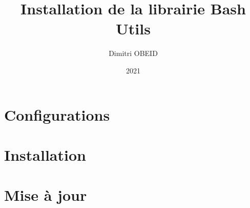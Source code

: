 \documentclass[a4paper,10pt]{article}
\title{Installation de la librairie Bash Utils}
\author{Dimitri OBEID}
\date{2021}
\begin{document}
\maketitle
\newpage

\tableofcontents
\newpage

\section{Configurations}
\subsection{}

\section{Installation}
\subsection{}

\section{Mise à jour}
\end{document}
